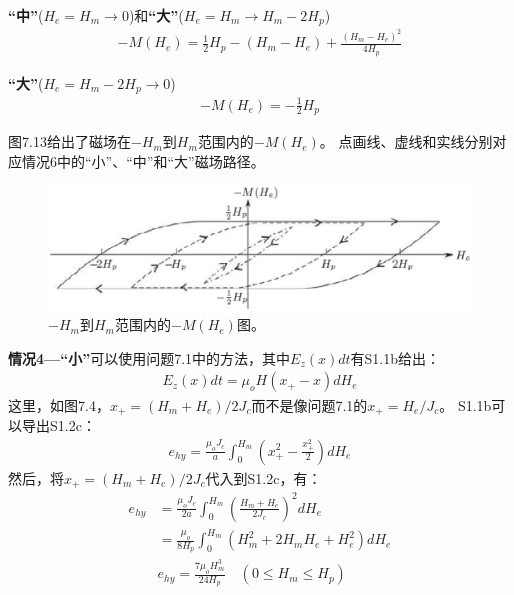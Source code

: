 \textbf{“中”}($H_e=H_m\rightarrow 0$)和\textbf{“大”}($H_e=H_m\rightarrow H_m-2H_p$)
\begin{align*}%
-M(H_e)=\frac{1}{2}H_p-(H_m-H_e)+\frac{(H_m-H_e)^2}{4H_p} \tag{5.7a}
\end{align*}

\textbf{“大”}($H_e=H_m-2H_p\rightarrow 0$)
\begin{align*}%
-M(H_e)=-\frac{1}{2}H_p
\end{align*}

图7.13给出了磁场在$-H_m$到$H_m$范围内的$-M(H_e)$。
点画线、虚线和实线分别对应情况6中的“小”、“中”和“大”磁场路径。
\begin{figure}[htbp]
	\centering
	\includegraphics[scale=0.7]{chpt7/figs/fig7.13.eps}
	\caption{$-H_m$到$H_m$范围内的$-M(H_e)$图。}
\end{figure}

\textbf{情况4---“小”}\quad 可以使用问题7.1中的方法，其中$E_z(x)dt$有S1.1b给出：
\begin{align*}%
E_z(x)dt=\mu_oH(x_+-x)dH_e \tag{S1.1b}
\end{align*}
这里，如图7.4，$x_+=(H_m+H_e)/2J_c$而不是像问题7.1的$x_+=H_e/J_c$。
S1.1b可以导出S1.2c：
\begin{align*}%
e_{hy}=\frac{\mu_oJ_c}{a}\int_{0}^{H_m}\left(x_{+}^{2}-\frac{x_{+}^{2}}{2}\right)dH_e \tag{S1.2c}
\end{align*}
然后，将$x_+=(H_m+H_e)/2J_c$代入到S1.2c，有：
\begin{align*}%
e_{hy}&=\frac{\mu_oJ_c}{2a}\int_{0}^{H_m}\left(\frac{H_m+H_e}{2J_c}\right)^2dH_e \\
&=\frac{\mu_o}{8H_p}\int_{0}^{H_m}(H_{m}^{2}+2H_mH_e+H_{e}^{2})dH_e\\
&e_{hy}=\frac{7\mu_oH_{m}^{3}}{24H_p} \quad(0\le H_m\le H_p) \tag{7.19a}
\end{align*}

